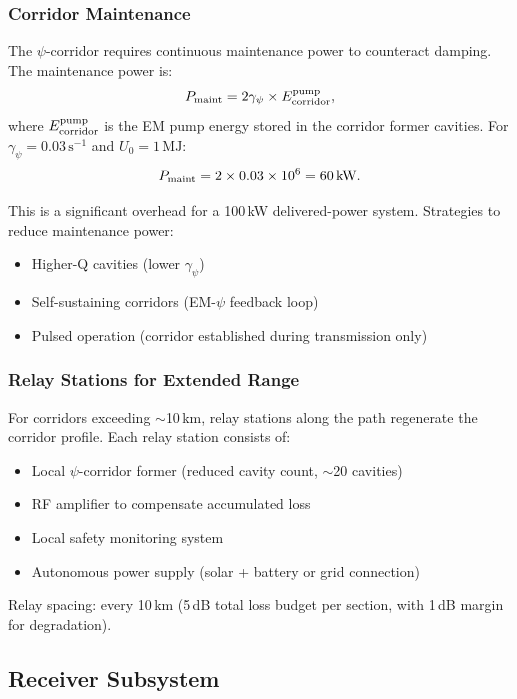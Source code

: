 \documentclass[11pt,a4paper]{article}
\begin{document}
\subsubsection{Corridor Maintenance}

The $\psi$-corridor requires continuous maintenance power to
counteract damping. The maintenance power is:
\begin{equation}
P_{\rm maint} = 2\gamma_\psi \times E_{\rm corridor}^{\rm pump},
\end{equation}
where $E_{\rm corridor}^{\rm pump}$ is the EM pump energy stored
in the corridor former cavities. For $\gamma_\psi = 0.03\,\text{s}^{-1}$
and $U_0 = 1\,\text{MJ}$:
\begin{equation}
P_{\rm maint} = 2 \times 0.03 \times 10^6 = 60\,\text{kW}.
\end{equation}

This is a significant overhead for a 100\,kW delivered-power system.
Strategies to reduce maintenance power:
\begin{itemize}
\item Higher-Q cavities (lower $\gamma_\psi$)
\item Self-sustaining corridors (EM-$\psi$ feedback loop)
\item Pulsed operation (corridor established during transmission only)
\end{itemize}

\subsubsection{Relay Stations for Extended Range}

For corridors exceeding $\sim$10\,km, relay stations along the path
regenerate the corridor profile. Each relay station consists of:
\begin{itemize}
\item Local $\psi$-corridor former (reduced cavity count, $\sim$20 cavities)
\item RF amplifier to compensate accumulated loss
\item Local safety monitoring system
\item Autonomous power supply (solar + battery or grid connection)
\end{itemize}

Relay spacing: every 10\,km (5\,dB total loss budget per section,
with 1\,dB margin for degradation).

\subsection{Receiver Subsystem}
\end{document}
